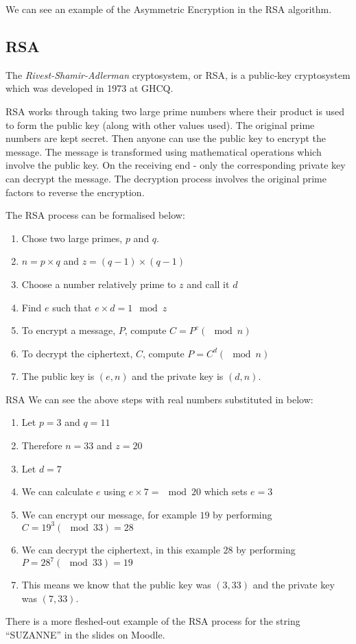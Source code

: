 We can see an example of the Asymmetric Encryption in the RSA algorithm. 

\subsection{RSA}
The \textit{Rivest-Shamir-Adlerman} cryptosystem, or RSA, is a public-key cryptosystem which was developed in 1973 at GHCQ. 

RSA works through taking two large prime numbers where their product is used to form the public key (along with other values used). The original prime numbers are kept secret. Then anyone can use the public key to encrypt the message. The message is transformed using mathematical operations which involve the public key. On the receiving end - only the corresponding private key can decrypt the message. The decryption process involves the original prime factors to reverse the encryption.

The RSA process can be formalised below:
\begin{enumerate}
    \item Chose two large primes, $p$ and $q$.
    \item $n=p\times q$ and $z=(q-1) \times (q-1)$
    \item Choose a number relatively prime to $z$ and call it $d$
    \item Find $e$ such that $e \times d = 1 \mod z$
    \item To encrypt a message, $P$, compute $C=P^e(\mod n)$
    \item To decrypt the ciphertext, $C$, compute $P=C^d(\mod n)$
    \item The public key is $(e, n)$ and the private key is $(d, n)$.
\end{enumerate}

\begin{example}{RSA}
We can see the above steps with real numbers substituted in below:
\begin{enumerate}
    \item Let $p=3$ and $q=11$
    \item Therefore $n=33$ and $z=20$
    \item Let $d=7$
    \item We can calculate $e$ using  $e \times 7 = \mod 20$ which sets $e=3$
    \item We can encrypt our message, for example $19$ by performing $C = 19^3(\mod 33)=28$
    \item We can decrypt the ciphertext, in this example $28$ by performing $P=28^7(\mod 33)=19$
    \item This means we know that the public key was $(3,33)$ and the private key was $(7,33)$.
\end{enumerate}
\end{example}

\begin{extlink}
There is a more fleshed-out example of the RSA process for the string ``SUZANNE'' in the slides on Moodle.
\end{extlink}
